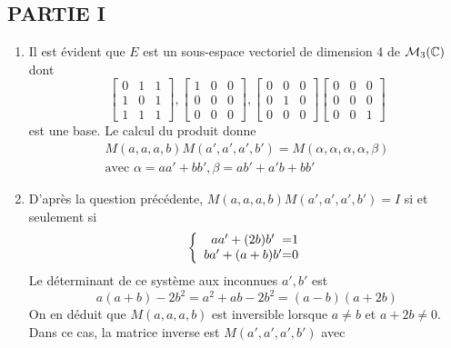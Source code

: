 \subsection*{PARTIE I}
\begin{enumerate}
\item Il est évident que $E$ est un sous-espace vectoriel de dimension 4 de $\mathcal{M}_{3}(\mathbb{C})$ dont
\[
\left [
\begin{array}{ccc}
0 & 1 & 1\\
1 & 0 & 1\\
1 & 1 & 1
\end{array}
\right ]
,\left [
\begin{array}{ccc}
1 & 0 & 0\\
0 & 0 & 0\\
0 & 0 & 0
\end{array}
\right ]
,\left [
\begin{array}{ccc}
0 & 0 & 0\\
0 & 1 & 0\\
0 & 0 & 0
\end{array}
\right ]
\left [
\begin{array}{ccc}
0 & 0 & 0\\
0 & 0 & 0\\
0 & 0 & 1
\end{array}
\right ]
\]
est une base. Le calcul du produit donne
\begin{eqnarray*}
M(a,a,a,b)M(a',a',a',b')=M(\alpha,\alpha,\alpha,\alpha,\beta)\\
\text{avec } \alpha=aa'+bb',\beta=ab'+a'b+bb'
\end{eqnarray*}
\item D'après la question précédente, $M(a,a,a,b)M(a',a',a',b')=I$ si et seulement si
\[
\left\{
\begin{array}{c@=c}
aa'+(2b)b'&1\\
ba'+(a+b)b'&0
\end{array}
\right.
\]
Le déterminant de ce système aux inconnues $a',b'$ est
\[a(a+b)-2b^{2}=a^{2}+ab-2b^{2}=(a-b)(a+2b)\]
On en déduit que $M(a,a,a,b)$ est inversible lorsque $a\neq b$ et $a+2b\neq 0$. Dans ce cas, la matrice inverse est $M(a',a',a',b')$ avec 


\end{enumerate}
